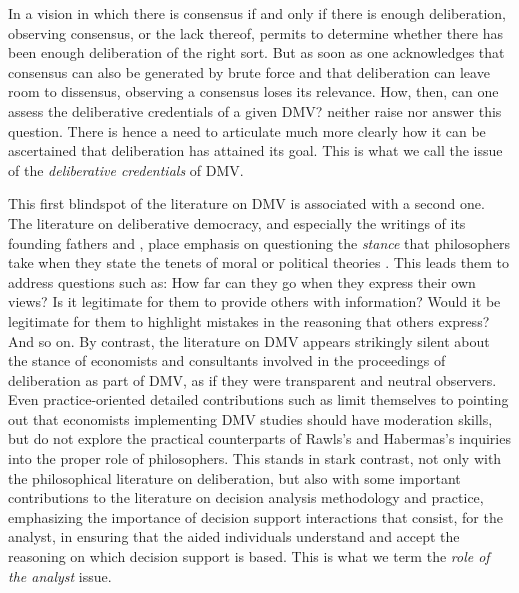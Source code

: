 \documentclass[version=3.21, pagesize, twoside=off, bibliography=totoc, DIV=calc, fontsize=12pt, a4paper, french, english]{scrartcl}
\begin{document}
{In a vision in which there is consensus if and only if there is enough deliberation, observing consensus, or the lack thereof, permits to determine whether there has been enough deliberation of the right sort.
But as soon as one acknowledges that consensus can also be generated by brute force and that deliberation can leave room to dissensus, observing a consensus loses its relevance. 
How, then, can one assess the deliberative credentials of a given DMV? 
\citeauthor{bartkowski_beyond_2018} neither raise nor answer this question.
There is hence a need to articulate much more clearly how it can be ascertained that deliberation has attained its goal. This is what we call the issue of the \emph{deliberative credentials} of DMV.

This first blindspot of the literature on DMV is associated with a second one. The literature on deliberative democracy, and especially the writings of its founding fathers \citet{rawls_political_2005} and \citet{habermas_faktizitat_1992}, place emphasis on questioning the \emph{stance} that philosophers take when they state the tenets of moral or political theories \citep{meinard_du_2014}. This leads them to address questions such as: How far can they go when they express their own views? Is it legitimate for them to provide others with information? Would it be legitimate for them to highlight mistakes in the reasoning that others express? And so on.
By contrast, the literature on DMV appears strikingly silent about the stance of economists and consultants involved in the proceedings of deliberation as part of DMV, as if they were transparent and neutral observers. Even practice-oriented detailed contributions such as \citet{schaafsma_guidance_2018} limit themselves to pointing out that economists implementing DMV studies should have moderation skills, but do not explore the practical counterparts of Rawls's and Habermas's inquiries into the proper role of philosophers. 
This stands in stark contrast, not only with the philosophical literature on deliberation, but also with some important contributions to the literature on decision analysis methodology and practice, emphasizing the importance of decision support interactions that consist, for the analyst, in ensuring that the aided individuals understand and accept the reasoning on which decision support is based.  
This is what we term the \emph{role of the analyst} issue.

}
\end{document}
